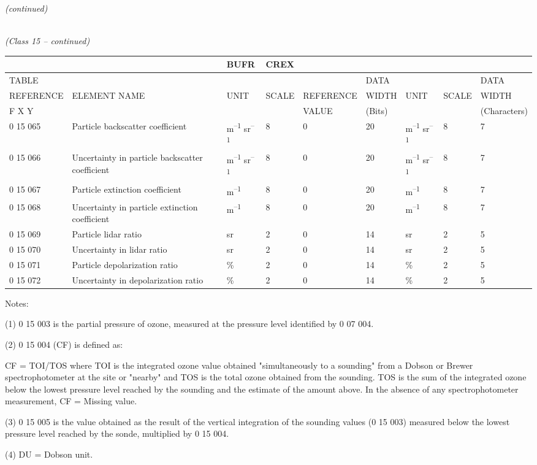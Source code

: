 \emph{(continued)}

\emph{\\
(Class 15 -- continued)}

\begin{longtable}[]{@{}lllllllll@{}}
\toprule
& & BUFR & CREX & & & & &\tabularnewline
\midrule
\endhead
TABLE & & & & & DATA & & & DATA\tabularnewline
REFERENCE & ELEMENT NAME & UNIT & SCALE & REFERENCE & WIDTH & UNIT & SCALE & WIDTH\tabularnewline
F X Y & & & & VALUE & (Bits) & & & (Characters)\tabularnewline
0 15 065 & Particle backscatter coefficient & m\textsuperscript{--1} sr\textsuperscript{--1} & 8 & 0 & 20 & m\textsuperscript{--1} sr\textsuperscript{--1} & 8 & 7\tabularnewline
0 15 066 & Uncertainty in particle backscatter coefficient & m\textsuperscript{--1} sr\textsuperscript{--1} & 8 & 0 & 20 & m\textsuperscript{--1} sr\textsuperscript{--1} & 8 & 7\tabularnewline
0 15 067 & Particle extinction coefficient & m\textsuperscript{--1} & 8 & 0 & 20 & m\textsuperscript{--1} & 8 & 7\tabularnewline
0 15 068 & Uncertainty in particle extinction coefficient & m\textsuperscript{--1} & 8 & 0 & 20 & m\textsuperscript{--1} & 8 & 7\tabularnewline
0 15 069 & Particle lidar ratio & sr & 2 & 0 & 14 & sr & 2 & 5\tabularnewline
0 15 070 & Uncertainty in lidar ratio & sr & 2 & 0 & 14 & sr & 2 & 5\tabularnewline
0 15 071 & Particle depolarization ratio & \% & 2 & 0 & 14 & \% & 2 & 5\tabularnewline
0 15 072 & Uncertainty in depolarization ratio & \% & 2 & 0 & 14 & \% & 2 & 5\tabularnewline
\bottomrule
\end{longtable}

Notes:

(1) 0 15 003 is the partial pressure of ozone, measured at the pressure level identified by 0 07 004.

(2) 0 15 004 (CF) is defined as:

CF = TOI/TOS where TOI is the integrated ozone value obtained "simultaneously to a sounding" from a Dobson or Brewer spectrophotometer at the site or "nearby" and TOS is the total ozone obtained from the sounding. TOS is the sum of the integrated ozone below the lowest pressure level reached by the sounding and the estimate of the amount above. In the absence of any spectrophotometer measurement, CF = Missing value.

(3) 0 15 005 is the value obtained as the result of the vertical integration of the sounding values (0 15 003) measured below the lowest pressure level reached by the sonde, multiplied by 0 15 004.

(4) DU = Dobson unit.

